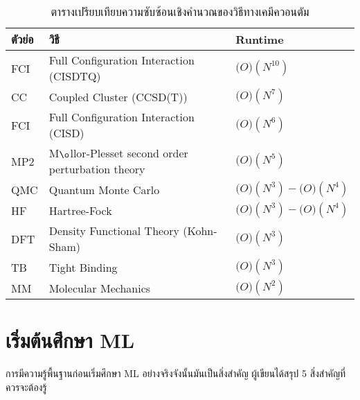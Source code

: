 \begin{table}[!htp]
    \centering
    \caption{ตารางเปรียบเทียบความซับซ้อนเชิงคำนวณของวิธีทางเคมีควอนตัม\cite{rupp2015}}
    \begin{tabular}{lll}\toprule
    ตัวย่อ &วิธี &Runtime \\\midrule
    FCI &Full Configuration Interaction (CISDTQ) &$\mathcal(O)(N^{10})$ \\
    CC &Coupled Cluster (CCSD(T)) &$\mathcal(O)(N^{7})$ \\
    FCI &Full Configuration Interaction (CISD) &$\mathcal(O)(N^{6})$ \\
    MP2 &M$\o$llor-Plesset second order perturbation theory &$\mathcal(O)(N^{5})$ \\
    QMC &Quantum Monte Carlo &$\mathcal(O)(N^{3}) - \mathcal(O)(N^{4})$ \\
    HF &Hartree-Fock &$\mathcal(O)(N^{3}) - \mathcal(O)(N^{4})$ \\
    DFT &Density Functional Theory (Kohn-Sham) &$\mathcal(O)(N^{3})$ \\
    TB &Tight Binding &$\mathcal(O)(N^{3})$ \\
    MM &Molecular Mechanics &$\mathcal(O)(N^{2})$ \\
    \bottomrule
    \end{tabular}
\end{table}

\section{เริ่มต้นศึกษา ML}

การมีความรู้พื้นฐานก่อนเริ่มศึกษา ML อย่างจริงจังนั้นมันเป็นสิ่งสำคัญ ผู้เขียนได้สรุป 5 สิ่งสำคัญที่ควรจะต้องรู้

